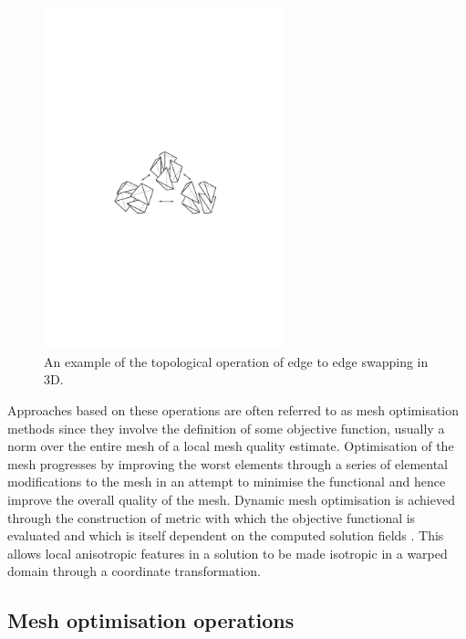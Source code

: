 \begin{figure}
\centering
\noindent\includegraphics[width=7cm]{images/edge2edge}
\caption{An example of the topological operation of edge to edge
  swapping in 3D.}
\label{Fig:edge2edge}
\end{figure}

Approaches based on these operations are often referred to as mesh
optimisation methods since they involve the definition of some
objective function, usually a norm over the entire mesh of a local
mesh quality estimate. Optimisation of the mesh progresses by
improving the worst elements through a series of elemental
modifications to the mesh in an attempt to minimise the functional and
hence improve the overall quality of the mesh. Dynamic mesh
optimisation is achieved through the construction of metric with which
the objective functional is evaluated and which is itself dependent on
the computed solution fields \citep{simpson1994, buscaglia1997,
  pain2001, piggott2005, power2006}. This allows local anisotropic
features in a solution to be made isotropic in a warped domain through
a coordinate transformation.

\subsection{Mesh optimisation operations}

